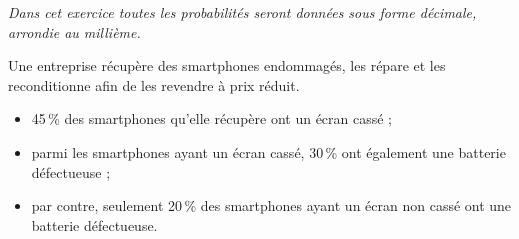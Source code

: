 \medskip

\emph{Dans cet exercice toutes les probabilités seront données sous forme décimale, arrondie au
millième.}
\medskip


Une entreprise récupère des smartphones endommagés, les répare et les reconditionne afin de
les revendre à prix réduit.

\begin{itemize}
\item  45\,\% des smartphones qu’elle récupère ont un écran cassé ; 
\item  parmi les smartphones ayant un écran cassé, 30\,\% ont également une batterie
défectueuse ;
 \item par contre, seulement 20\,\% des smartphones ayant un écran non cassé ont une batterie
défectueuse.
\end{itemize}
